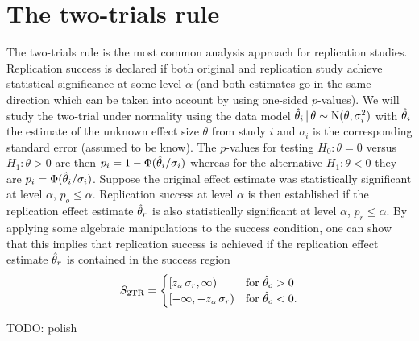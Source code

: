 \documentclass[a4paper, 11pt]{article}
\begin{document}
\section{The two-trials rule}
The two-trials rule is the most common analysis approach for replication
studies. Replication success is declared if both original and replication study
achieve statistical significance at some level $\alpha$ (and both estimates go
in the same direction which can be taken into account by using one-sided
$p$-values). We will study the two-trial under normality using the data model
$\hat{\theta}_{i} \,\vert\, \theta \sim \operatorname{N}(\theta, \sigma^{2}_{i})$ with $\hat{\theta}_{i}$ the
estimate of the unknown effect size $\theta$ from study $i$ and $\sigma_{i}$ is
the corresponding standard error (assumed to be know). The $p$-values for
testing $H_{0} \colon \theta = 0$ versus $H_{1} \colon \theta > 0$ are then
$p_{i} = 1 - \Phi(\hat{\theta}_{i}/\sigma_{i})$ whereas for the alternative
$H_{1} \colon \theta < 0$ they are $p_{i} = \Phi(\hat{\theta}_{i}/\sigma_{i})$. Suppose
the original effect estimate was statistically significant at level $\alpha$,
\ie{} $p_{o} \leq \alpha$. Replication success at level $\alpha$ is then
established if the replication effect estimate $\hat{\theta}_{r}$ is also statistically
significant at level $\alpha$, \ie{} $p_{r} \leq \alpha$. By applying some
algebraic manipulations to the success condition, one can show that this implies
that replication success is achieved if the replication effect estimate
$\hat{\theta}_{r}$ is contained in the success region
\begin{align*}
  S_{\text{2TR}} =
  \begin{cases}
    \left[z_{\scriptscriptstyle \alpha} \, \sigma_{r}, \infty \right) & \text{for} ~ \hat{\theta}_{o} > 0 \\
    \left[-\infty, -z_{\scriptscriptstyle \alpha} \, \sigma_{r} \right) & \text{for} ~ \hat{\theta}_{o} < 0.
  \end{cases}
\end{align*}

TODO: polish
\end{document}
